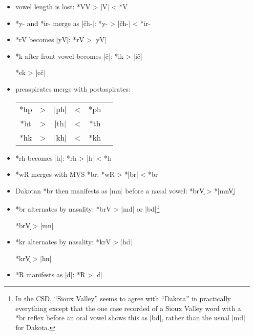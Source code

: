 \documentclass[output=paper]{LSP/langsci}
\begin{document}
\begin{itemize}
\item vowel length is lost: \hspace{4.2em} *VV	>	|V|	<	*V

\item *y- and *ir- merge as |\v{c}h-|: \hspace{2em} *y-	>	|\v{c}h-|	<	*ir-

\item *rV becomes |yV|:	 \hspace{5.3em} *rV	>	|yV|

\item *k after front vowel becomes |\v{c}|: \hspace{1em} *ik	>	|i\v{c}|

\hspace{14.2em} *ek	>	|e\v{c}|

\item preaspirates merge with postaspirates:

\begin{center}
\begin{tabular}[t]{c c c c c c }
*hp & > & |ph| & < & *ph \\
*ht	& > & |th| & < & *th \\
*hk & > & |kh| & < & *kh \\
\end{tabular}
\end{center}

\item *rh becomes |h|: \hspace{4em} *rh	>	|h|	<	*h

\item *wR merges with MVS *br: \hspace{1em}*wR	>	*|br|	<	*br
\item  Dakotan *br then manifests as |mn| before a nasal vowel:              *br\k{V}    >          *|mn\k{V}|
\end{itemize}


\begin{itemize}
\item  *br alternates by nasality: \hspace{1em} *brV		>	|md| or |bd|\footnote{In the CSD, ``Sioux Valley'' seems to agree with ``Dakota'' in practically everything except that the one case recorded of a Sioux Valley word with a *br reflex before an oral vowel shows this as |bd|, rather than the usual |md| for Dakota.}

\hspace{12em} *br\k{V}	>	|mn|

\item  *kr alternates by nasality:  \hspace{1.2em} *krV       >          |hd|

\hspace{12em} *kr\k{V}	>	|hn|

\item *R manifests as |d|: \hspace{4.5em} *R	>	|d|
\end{itemize}
\end{document}
